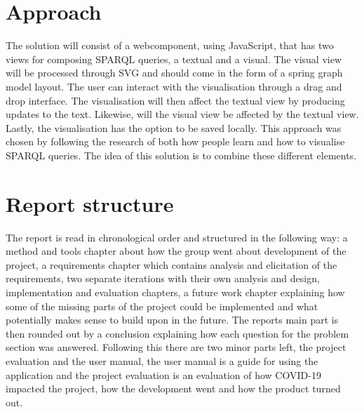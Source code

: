 \section{Approach}
The solution will consist of a webcomponent, using JavaScript, that has two views for composing SPARQL queries, a textual and a visual. The visual view will be processed through SVG and should come in the form of a spring graph model layout. The user can interact with the visualisation through a drag and drop interface. The visualisation will then affect the textual view by producing updates to the text. Likewise, will the visual view be affected by the textual view. Lastly, the visualisation has the option to be saved locally. This approach was chosen by following the research of both how people learn and how to visualise SPARQL queries. The idea of this solution is to combine these different elements.

\section{Report structure}
The report is read in chronological order and structured in the following way: a method and tools chapter about how the group went about development of the project, a requirements chapter which contains analysis and elicitation of the requirements, two separate iterations with their own analysis and design, implementation and evaluation chapters, a future work chapter explaining how some of the missing parts of the project could be implemented and what potentially makes sense to build upon in the future. The reports main part is then rounded out by a conclusion explaining how each question for the problem section was answered. Following this there are two minor parts left, the project evaluation and the user manual, the user manual is a guide for using the application and the project evaluation is an evaluation of how COVID-19 impacted the project, how the development went and how the product turned out. 